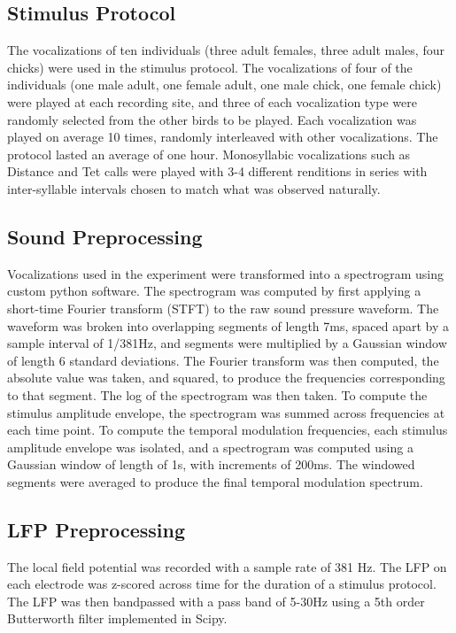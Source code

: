\subsection{Stimulus Protocol}

    The vocalizations of ten individuals (three adult females, three adult males, four chicks) were used in the stimulus protocol. The vocalizations of four of the individuals (one male adult, one female adult, one male chick, one female chick) were played at each recording site, and three of each vocalization type were randomly selected from the other birds to be played. Each vocalization was played on average 10 times, randomly interleaved with other vocalizations. The protocol lasted an average of one hour. Monosyllabic vocalizations such as Distance and Tet calls were played with 3-4 different renditions in series with inter-syllable intervals chosen to match what was observed naturally.

\subsection{Sound Preprocessing}

Vocalizations used in the experiment were transformed into a spectrogram using custom python software. The spectrogram was computed by first applying a short-time Fourier transform (STFT) to the raw sound pressure waveform. The waveform was broken into overlapping segments of length 7ms, spaced apart by a sample interval of 1/381Hz, and segments were multiplied by a Gaussian window of length 6 standard deviations. The Fourier transform was then computed, the absolute value was taken, and squared, to produce the frequencies corresponding to that segment. The log of the spectrogram was then taken.
To compute the stimulus amplitude envelope, the spectrogram was summed across frequencies at each time point. To compute the temporal modulation frequencies, each stimulus amplitude envelope was isolated, and a spectrogram was computed using a Gaussian window of length of 1s, with increments of 200ms. The windowed segments were averaged to produce the final temporal modulation spectrum.

\subsection{LFP Preprocessing}

The local field potential was recorded with a sample rate of 381 Hz. The LFP on each electrode was z-scored across time for the duration of a stimulus protocol. The LFP was then bandpassed with a pass band of 5-30Hz using a 5th order Butterworth filter implemented in Scipy.

